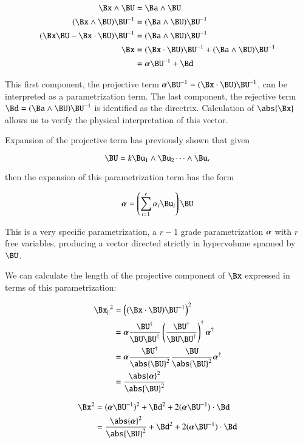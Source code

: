 \begin{align*}
\Bx \wedge \BU &= \Ba \wedge \BU \\
(\Bx \wedge \BU){\BU}^{-1} &= (\Ba \wedge \BU){\BU}^{-1} \\
(\Bx\BU - \Bx \cdot \BU){\BU}^{-1} &= (\Ba \wedge \BU){\BU}^{-1} \\
\Bx &= (\Bx \cdot \BU){\BU}^{-1} + (\Ba \wedge \BU){\BU}^{-1} \\
    &= \Balpha{\BU}^{-1} + \Bd \\
\end{align*}

This first component, the projective term $\Balpha{\BU}^{-1} = (\Bx \cdot \BU){\BU}^{-1}$, can be interpreted as a parametrization term.  The 
last component, the rejective term $\Bd = (\Ba \wedge \BU){\BU}^{-1}$ is identified as the directrix.  Calculation of $\abs{\Bx}$ allows us to verify the physical interpretation of this vector.

Expansion of the projective term has previously shown that given

\[
\BU = k \Bu_1 \wedge \Bu_2 \cdots \wedge \Bu_r
\]

then the expansion of this parametrization term has the form

\[
\Balpha = \left(\sum_{i = 1}^{r}{\alpha_i \Bu_i}\right)\BU
\]

This is a very specific parametrization, a $r-1$ grade parametrization $\boldsymbol{\alpha}$ with $r$ free variables, producing
a vector directed strictly in hypervolume spanned by $\BU$.

We can calculate the length of the projective component of $\Bx$ expressed in terms of this parametrization:

\begin{align*}
{\Bx_\parallel}^2
&= \left((\Bx \cdot \BU) {\BU}^{-1}\right)^2 \\
&= \Balpha \frac{{\BU}^\dagger}{\BU \BU^\dagger}   \left( \frac{{\BU}^\dagger}{\BU \BU^\dagger} \right)^\dagger {\Balpha}^\dagger \\
&= \Balpha \frac{{\BU}^\dagger} {\abs{\BU}^2} \frac{\BU} {\abs{\BU}^2} {\Balpha}^\dagger \\
&= \frac{\abs{\Balpha}^2}{{\abs{\BU}^2}} \\
\end{align*}

\begin{align*}
{\Bx}^2 
&= (\Balpha {\BU}^{-1})^2 + \Bd^2 + 2 (\Balpha \BU^{-1}) \cdot \Bd \\
&= \frac{\abs{\Balpha}^2}{{\abs{\BU}^2}} + \Bd^2 + 2 (\Balpha \BU^{-1}) \cdot \Bd
\end{align*}

